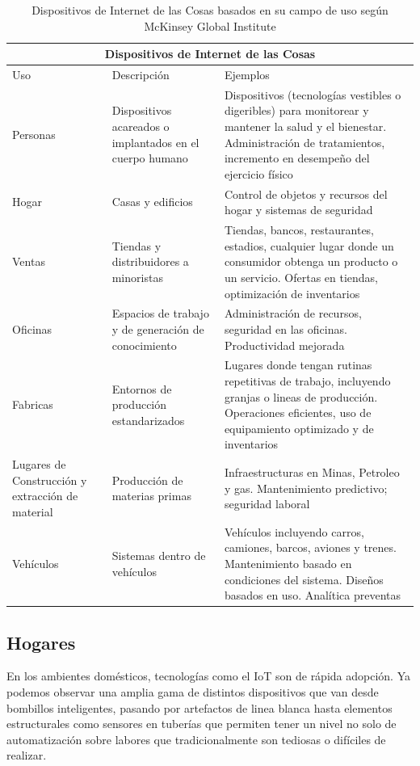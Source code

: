 \begin{table}[ht]
\centering
\begin{tabular}{| m{3.2cm}| m{4.5cm}| m{6.6cm}|}
\hline
\multicolumn{3}{|c|}{Dispositivos de Internet de las Cosas} \\
\hline 
\centering Uso & \centering Descripción & \centering Ejemplos \tabularnewline \hline
Personas & Dispositivos acareados o implantados en el cuerpo humano & Dispositivos (tecnologías vestibles o digeribles) para monitorear y mantener la salud y el bienestar. Administración de tratamientos, incremento en desempeño del ejercicio físico \\ \hline
Hogar & Casas y edificios & Control de objetos y recursos del hogar y sistemas de seguridad\\ \hline
Ventas & Tiendas y distribuidores a minoristas & Tiendas, bancos, restaurantes, estadios, cualquier lugar donde un consumidor obtenga un producto o un servicio. Ofertas en tiendas, optimización de inventarios \\ \hline
Oficinas & Espacios de trabajo y de generación de conocimiento & Administración de recursos, seguridad en las oficinas. Productividad mejorada \\ \hline
Fabricas & Entornos de producción estandarizados & Lugares donde tengan rutinas repetitivas de trabajo, incluyendo granjas o lineas de producción. Operaciones eficientes, uso de equipamiento optimizado y de inventarios \\ \hline
Lugares de Construcción y extracción de material & Producción de materias primas & Infraestructuras en Minas, Petroleo y gas. Mantenimiento predictivo; seguridad laboral \\ \hline
Vehículos & Sistemas dentro de vehículos & Vehículos incluyendo carros, camiones, barcos, aviones y trenes. Mantenimiento basado en condiciones del sistema. Diseños basados en uso. Analítica preventas \\ \hline
\end{tabular}
\caption{Dispositivos de Internet de las Cosas basados en su campo de uso según McKinsey Global Institute}
\label{tabla:categorias_dispositivos}
\end{table}

\subsection{Hogares}
En los ambientes domésticos, tecnologías como el IoT son de rápida adopción. Ya podemos observar una amplia gama de distintos dispositivos que van desde bombillos inteligentes, pasando por artefactos de linea blanca hasta elementos estructurales como sensores en tuberías que permiten tener un nivel no solo de automatización sobre labores que tradicionalmente son tediosas o difíciles de realizar.\\

